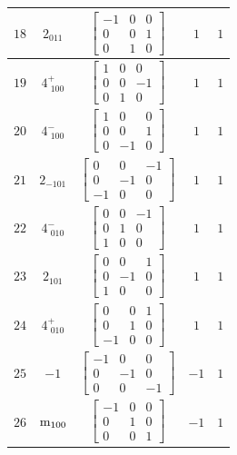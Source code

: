 \documentclass[fleqn,8pt]{jsarticle}
\begin{document}
\begin{longtable}{ccccc}
$ 18 $ & $ 2{}_{011} $ & $ \begin{bmatrix} -1 & 0 & 0 \\ 0 & 0 & 1 \\ 0 & 1 & 0 \end{bmatrix} $ & $ 1 $ & $ 1 $ \\ \hline
$ 19 $ & $ 4^{+}_{\,\,100} $ & $ \begin{bmatrix} 1 & 0 & 0 \\ 0 & 0 & -1 \\ 0 & 1 & 0 \end{bmatrix} $ & $ 1 $ & $ 1 $ \\ \hline
$ 20 $ & $ 4^{-}_{\,\,100} $ & $ \begin{bmatrix} 1 & 0 & 0 \\ 0 & 0 & 1 \\ 0 & -1 & 0 \end{bmatrix} $ & $ 1 $ & $ 1 $ \\ \hline
$ 21 $ & $ 2{}_{-101} $ & $ \begin{bmatrix} 0 & 0 & -1 \\ 0 & -1 & 0 \\ -1 & 0 & 0 \end{bmatrix} $ & $ 1 $ & $ 1 $ \\ \hline
$ 22 $ & $ 4^{-}_{\,\,010} $ & $ \begin{bmatrix} 0 & 0 & -1 \\ 0 & 1 & 0 \\ 1 & 0 & 0 \end{bmatrix} $ & $ 1 $ & $ 1 $ \\ \hline
$ 23 $ & $ 2{}_{101} $ & $ \begin{bmatrix} 0 & 0 & 1 \\ 0 & -1 & 0 \\ 1 & 0 & 0 \end{bmatrix} $ & $ 1 $ & $ 1 $ \\ \hline
$ 24 $ & $ 4^{+}_{\,\,010} $ & $ \begin{bmatrix} 0 & 0 & 1 \\ 0 & 1 & 0 \\ -1 & 0 & 0 \end{bmatrix} $ & $ 1 $ & $ 1 $ \\ \hline
$ 25 $ & $ -1 $ & $ \begin{bmatrix} -1 & 0 & 0 \\ 0 & -1 & 0 \\ 0 & 0 & -1 \end{bmatrix} $ & $ -1 $ & $ 1 $ \\ \hline
$ 26 $ & $ {\rm m}_{100} $ & $ \begin{bmatrix} -1 & 0 & 0 \\ 0 & 1 & 0 \\ 0 & 0 & 1 \end{bmatrix} $ & $ -1 $ & $ 1 $ \\ \hline

\end{longtable}
\end{document}
